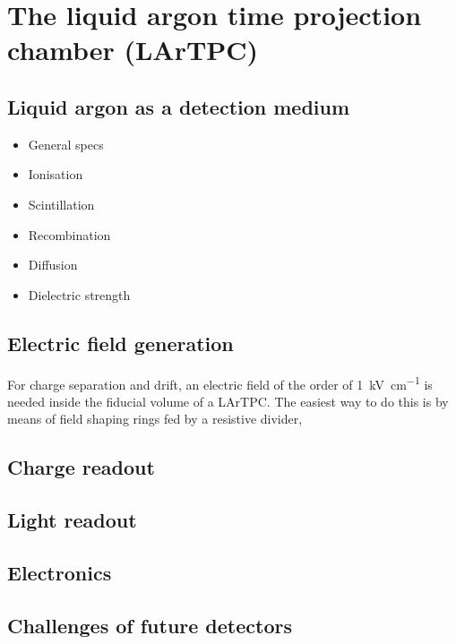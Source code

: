 \chapter{The liquid argon time projection chamber (LArTPC)\label{chap:lartpc}}


\section{Liquid argon as a detection medium\label{sec:lartpc_lar}}
\begin{itemize}
	\item General specs
	\item Ionisation
	\item Scintillation
	\item Recombination
	\item Diffusion
	\item Dielectric strength
\end{itemize}


\section{Electric field generation\label{sec:lartpc_efield}}
For charge separation and drift, an electric field of the order of \SI{1}{\kilo\volt\per\centi\metre} is needed inside the fiducial volume of a LArTPC.
The easiest way to do this is by means of field shaping rings fed by a resistive divider,


\section{Charge readout\label{sec:lartpc_readout}}


\section{Light readout\label{sec:lartpc_light}}


\section{Electronics\label{sec:lartpc_electronics}}


\section{Challenges of future detectors\label{sec:lartpc_challenges}}